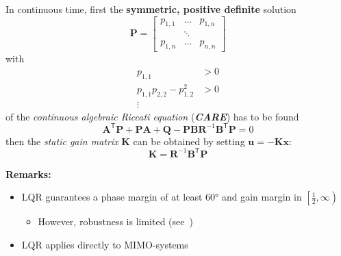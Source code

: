 In continuous time, first the \textbf{symmetric, positive definite} solution
\begin{equation*}
    \mathbf{P}=\begin{bmatrix} p_{1,1} & \dots  & p_{1,n} \\
                        & \ddots &         \\
                p_{1,n} & \dots  & p_{n,n}
    \end{bmatrix}
\end{equation*}
with
\begin{align*}
    p_{1,1}                   & >0 \\
    p_{1,1}p_{2,2} -p_{1,2}^2 & >0 \\
    \vdots
\end{align*}
of the \textit{continuous algebraic Riccati equation} (\textbf{\textit{CARE}}) has to be found
\noindent\begin{equation*}
    \mathbf{A}^{\mathsf{T}} \mathbf{P}+\mathbf{PA}+\mathbf{Q}-\mathbf{PBR}^{-1}\mathbf{B}^{\mathsf{T}} \mathbf{P}=0
\end{equation*}
then the \textit{static gain matrix} $\mathbf{K}$ can be obtained by setting $\mathbf{u} = -\mathbf{Kx}$:
\noindent\begin{equation*}
    \mathbf{K}=\mathbf{R}^{-1}\mathbf{B}^{\mathsf{T}} \mathbf{P}
\end{equation*}

\textbf{Remarks:}

\begin{itemize}
    \item LQR guarantees a phase margin of at least 60° and gain margin in $\left[\frac{1}{2},\infty\right)$
    \begin{itemize}
        \item However, robustness is limited (see\ \cite{539438})
    \end{itemize}
    \item LQR applies directly to MIMO-systems
\end{itemize}

\newpar{}
\textbf{} 


